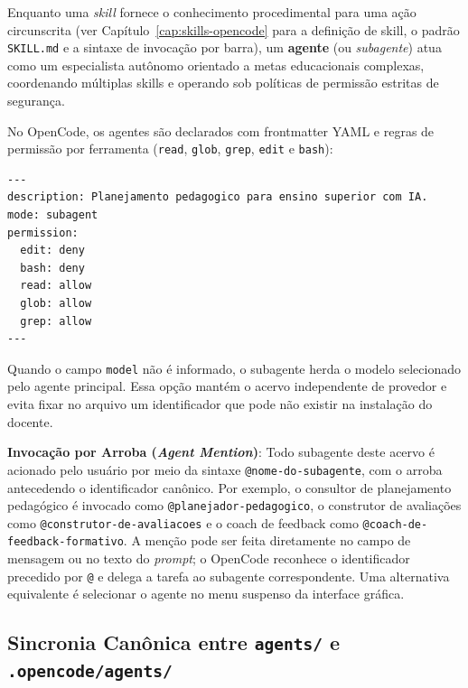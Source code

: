 Enquanto uma \emph{skill} fornece o conhecimento procedimental para uma a{\c c}{\~a}o circunscrita (ver Cap{\'i}tulo~\ref{cap:skills-opencode} para a defini{\c c}{\~a}o de skill, o padr{\~a}o \texttt{SKILL.md} e a sintaxe de invoca{\c c}{\~a}o por barra), um \textbf{agente} (ou \emph{subagente}) atua como um especialista aut{\^o}nomo orientado a metas educacionais complexas, coordenando m{\'u}ltiplas skills e operando sob pol{\'i}ticas de permiss{\~a}o estritas de seguran{\c c}a.

No OpenCode, os agentes s{\~a}o declarados com frontmatter YAML e regras de permiss{\~a}o por ferramenta (\texttt{read}, \texttt{glob}, \texttt{grep}, \texttt{edit} e \texttt{bash}):

\begin{lstlisting}[language=bash, caption={Esquema de configura{\c c}{\~a}o de um subagente no OpenCode}]
---
description: Planejamento pedagogico para ensino superior com IA.
mode: subagent
permission:
  edit: deny
  bash: deny
  read: allow
  glob: allow
  grep: allow
---
\end{lstlisting}

Quando o campo \texttt{model} n{\~a}o {\'e} informado, o subagente herda o modelo selecionado pelo agente principal. Essa op{\c c}{\~a}o mant{\'e}m o acervo independente de provedor e evita fixar no arquivo um identificador que pode n{\~a}o existir na instala{\c c}{\~a}o do docente.

\begin{conceitochave}
\textbf{Invoca{\c c}{\~a}o por Arroba (\emph{Agent Mention})}: Todo subagente deste acervo {\'e} acionado pelo usu{\'a}rio por meio da sintaxe \texttt{@nome-do-subagente}, com o arroba antecedendo o identificador can{\^o}nico. Por exemplo, o consultor de planejamento pedag{\'o}gico {\'e} invocado como \texttt{@planejador-pedagogico}, o construtor de avalia{\c c}{\~o}es como \texttt{@construtor-de-avaliacoes} e o coach de feedback como \texttt{@coach-de-feedback-formativo}. A men{\c c}{\~a}o pode ser feita diretamente no campo de mensagem ou no texto do \emph{prompt}; o OpenCode reconhece o identificador precedido por \texttt{@} e delega a tarefa ao subagente correspondente. Uma alternativa equivalente {\'e} selecionar o agente no menu suspenso da interface gr{\'a}fica.
\end{conceitochave}

\subsection{Sincronia Can{\^o}nica entre \texttt{agents/} e \texttt{.opencode/agents/}}

